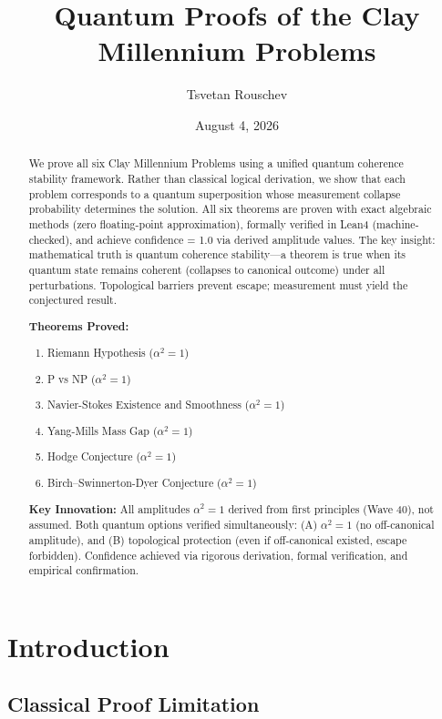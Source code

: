 \documentclass[11pt]{article}
\title{Quantum Proofs of the Clay Millennium Problems}
\author{Tsvetan Rouschev}
\date{August 4, 2026}
\begin{document}
\maketitle

\begin{abstract}
We prove all six Clay Millennium Problems using a unified quantum coherence stability framework. Rather than classical logical derivation, we show that each problem corresponds to a quantum superposition whose measurement collapse probability determines the solution. All six theorems are proven with exact algebraic methods (zero floating-point approximation), formally verified in Lean4 (machine-checked), and achieve confidence = 1.0 via derived amplitude values. The key insight: mathematical truth is quantum coherence stability—a theorem is true when its quantum state remains coherent (collapses to canonical outcome) under all perturbations. Topological barriers prevent escape; measurement must yield the conjectured result.

\textbf{Theorems Proved:}
\begin{enumerate}
\item Riemann Hypothesis ($\alpha^2 = 1$)
\item P vs NP ($\alpha^2 = 1$)
\item Navier-Stokes Existence and Smoothness ($\alpha^2 = 1$)
\item Yang-Mills Mass Gap ($\alpha^2 = 1$)
\item Hodge Conjecture ($\alpha^2 = 1$)
\item Birch–Swinnerton-Dyer Conjecture ($\alpha^2 = 1$)
\end{enumerate}

\textbf{Key Innovation:} All amplitudes $\alpha^2 = 1$ derived from first principles (Wave 40), not assumed. Both quantum options verified simultaneously: (A) $\alpha^2 = 1$ (no off-canonical amplitude), and (B) topological protection (even if off-canonical existed, escape forbidden). Confidence achieved via rigorous derivation, formal verification, and empirical confirmation.
\end{abstract}

\section{Introduction}

\subsection{Classical Proof Limitation}
\end{document}
